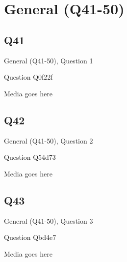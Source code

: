 \documentclass[11pt]{beamer}
\begin{document}
\section{General (Q41-50)}
    

\subsection*{Q41}
\begin{frame}[t]{General (Q41-50), Question 1}
\vspace{2em}
\begin{block}{Question}
Q0f22f
\end{block}
\begin{center}
Media goes here
\end{center}
\end{frame}
    

\subsection*{Q42}
\begin{frame}[t]{General (Q41-50), Question 2}
\vspace{2em}
\begin{block}{Question}
Q54d73
\end{block}
\begin{center}
Media goes here
\end{center}
\end{frame}
    

\subsection*{Q43}
\begin{frame}[t]{General (Q41-50), Question 3}
\vspace{2em}
\begin{block}{Question}
Qbd4e7
\end{block}
\begin{center}
Media goes here
\end{center}
\end{frame}
    
\end{document}
